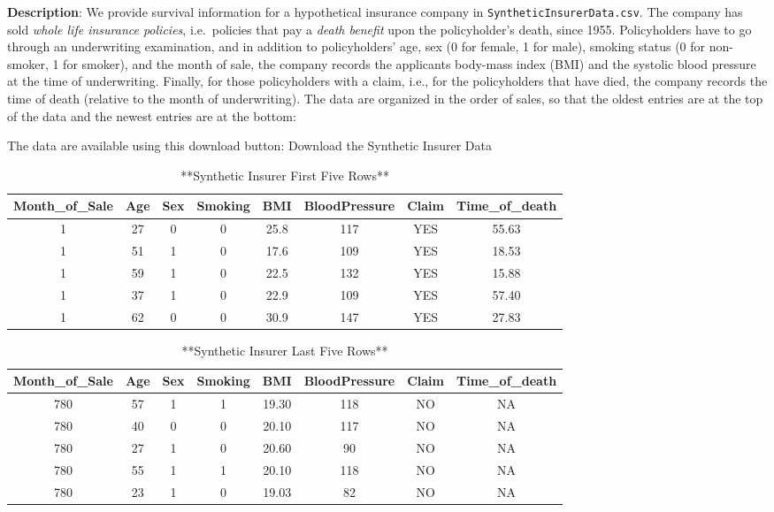 \documentclass[
]{book}
\begin{document}
\textbf{Description}: We provide survival information for a hypothetical insurance company in \texttt{SyntheticInsurerData.csv}. The company has sold \emph{whole life insurance policies}, i.e.~policies that pay a \emph{death benefit} upon the policyholder's death, since 1955. Policyholders have to go through an underwriting examination, and in addition to policyholders' age, sex (0 for female, 1 for male), smoking status (0 for non-smoker, 1 for smoker), and the month of sale, the company records the applicants body-mass index (BMI) and the systolic blood pressure at the time of underwriting. Finally, for those policyholders with a claim, i.e., for the policyholders that have died, the company records the time of death (relative to the month of underwriting). The data are organized in the order of sales, so that the oldest entries are at the top of the data and the newest entries are at the bottom:

The data are available using this download button:
Download the Synthetic Insurer Data

\begin{table}

\caption{\label{tab:unnamed-chunk-16}**Synthetic Insurer First Five Rows**}
\centering
\begin{tabular}[t]{c|c|c|c|c|c|c|c}
\hline
Month\_of\_Sale & Age & Sex & Smoking & BMI & BloodPressure & Claim & Time\_of\_death\\
\hline
1 & 27 & 0 & 0 & 25.8 & 117 & YES & 55.63\\
\hline
1 & 51 & 1 & 0 & 17.6 & 109 & YES & 18.53\\
\hline
1 & 59 & 1 & 0 & 22.5 & 132 & YES & 15.88\\
\hline
1 & 37 & 1 & 0 & 22.9 & 109 & YES & 57.40\\
\hline
1 & 62 & 0 & 0 & 30.9 & 147 & YES & 27.83\\
\hline
\end{tabular}
\end{table}

\begin{table}

\caption{\label{tab:unnamed-chunk-16}**Synthetic Insurer Last Five Rows**}
\centering
\begin{tabular}[t]{c|c|c|c|c|c|c|c}
\hline
Month\_of\_Sale & Age & Sex & Smoking & BMI & BloodPressure & Claim & Time\_of\_death\\
\hline
780 & 57 & 1 & 1 & 19.30 & 118 & NO & NA\\
\hline
780 & 40 & 0 & 0 & 20.10 & 117 & NO & NA\\
\hline
780 & 27 & 1 & 0 & 20.60 & 90 & NO & NA\\
\hline
780 & 55 & 1 & 1 & 20.10 & 118 & NO & NA\\
\hline
780 & 23 & 1 & 0 & 19.03 & 82 & NO & NA\\
\hline
\end{tabular}
\end{table}
\end{document}
